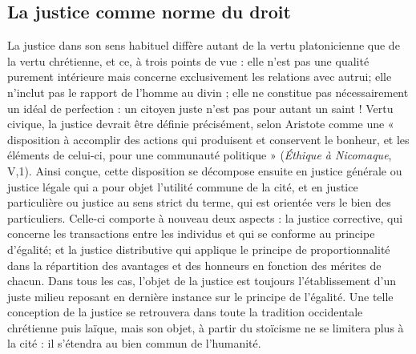 \subsection{La justice comme norme du droit}

La justice dans son sens habituel diffère
autant de la vertu platonicienne que de
la vertu chrétienne, et ce, à trois points
de vue : elle n’est pas une qualité purement intérieure mais concerne exclusivement les relations avec autrui; elle
n'inclut pas le rapport de l’homme au
divin ; elle ne constitue pas nécessairement un idéal de perfection : un citoyen
juste n'est pas pour autant un saint !
Vertu civique, la justice devrait être définie précisément, selon Aristote comme
une « disposition à accomplir des actions
qui produisent et conservent le bonheur, et les éléments de celui-ci, pour
une communauté politique » ({\it Éthique à
Nicomaque}, V,1). Ainsi conçue, cette
%
disposition se décompose ensuite en
justice générale ou justice légale qui a
pour objet l'utilité commune de la cité,
et en justice particulière ou justice au
sens strict du terme, qui est orientée vers
le bien des particuliers. Celle-ci
comporte à nouveau deux aspects : la
justice corrective, qui concerne les transactions entre les individus et qui se
conforme au principe d'égalité; et la
justice distributive qui applique le principe de proportionnalité dans la répartition des avantages et des honneurs en
fonction des mérites de chacun. Dans
tous les cas, l’objet de la justice est toujours l'établissement d'un juste milieu
reposant en dernière instance sur le
principe de l'égalité. Une telle conception de la justice se retrouvera dans
toute la tradition occidentale chrétienne
puis laïque, mais son objet, à partir du
stoïcisme ne se limitera plus à la cité :
il s’étendra au bien commun de l'humanité.

